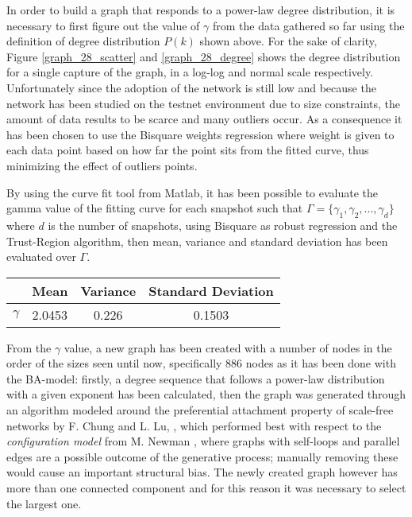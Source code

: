 	In order to build a graph that responds to a power-law degree distribution, it is necessary to first figure out the value of $\gamma$ from the data gathered so far using the definition of degree distribution $P(k)$ shown above. For the sake of clarity, Figure \ref{graph_28_scatter} and \ref{graph_28_degree} shows the degree distribution for a single capture of the graph, in  a log-log and normal scale respectively. Unfortunately since the adoption of the network is still low and because the network has been studied on the testnet environment due to size constraints, the amount of data results to be scarce and many outliers occur. As a consequence it has been chosen to use the Bisquare weights regression where weight is given to each data point based on how far the point sits from the fitted curve, thus minimizing the effect of outliers points.
	
	By using the curve fit tool from Matlab, it has been possible to evaluate the gamma value of the fitting curve for each snapshot such that $\Gamma = \{\gamma_1, \gamma_2, ... , \gamma_d\}$ where $d$ is the number of snapshots, using Bisquare as robust regression and the Trust-Region algorithm, then mean, variance and standard deviation has been evaluated over $\Gamma$.
	
	\begin{center}
		\begin{tabulary}{0.75\linewidth}{| L | C | C | C | }
			\hline
			& Mean & Variance & Standard Deviation \\ \hline
			$\gamma$ & 2.0453 & 0.226 & 0.1503  \\ \hline
		\end{tabulary}
	\end{center}
	
	
	From the $\gamma$ value, a new graph has been created with a number of nodes in the order of the sizes seen until now, specifically 886 nodes as it has been done with the BA-model: firstly, a degree sequence that follows a power-law distribution with a given exponent has been calculated, then the graph was generated through an algorithm modeled around the preferential attachment property of scale-free networks by F. Chung and L. Lu, \cite{Chung2002}, which performed best with respect to the \textit{configuration model} from M. Newman \cite{Newman2003}, where graphs with self-loops and parallel edges are a possible outcome of the generative process; manually removing these would cause an important structural bias. The newly created graph however has more than one connected component and for this reason it was necessary to select the largest one. 
	
